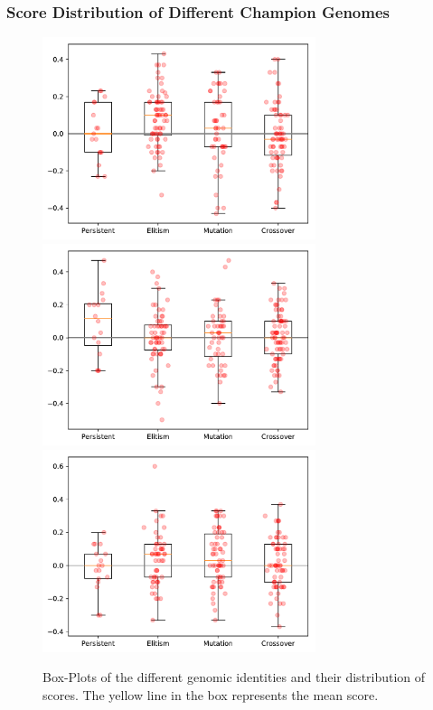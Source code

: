 \documentclass{beamer}
\begin{document}
  \begin{frame}
    \centering
    \frametitle{Score Distribution of Different Champion Genomes} 
    \begin{figure}[!ht]
      \includegraphics[width=80mm]{images/results/1ply/champ_score_distribution.pdf}
      \includegraphics[width=80mm]{images/results/3ply/champ_score_distribution.pdf}
      \includegraphics[width=80mm]{images/results/6ply/champ_score_distribution.pdf}
      \caption{Box-Plots of the different genomic identities and their distribution of scores. The yellow line in the box represents the mean score. \label{champ_score_distribution}}
  \end{figure}

  \end{frame}
\end{document}
